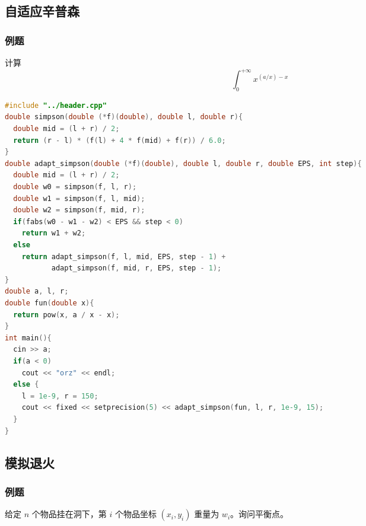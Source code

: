 \documentclass[10pt]{ctexart}
\begin{document}
\begin{multicols}{3}
    \subsection{自适应辛普森}\label{ux81eaux9002ux5e94ux8f9bux666eux68ee}

    \subsubsection{例题}\label{ux4f8bux9898-10}

    计算 \[\int_{0}^{+\infty} x^{(a/x) - x}\]

\begin{lstlisting}[language={C++}]
#include "../header.cpp"
double simpson(double (*f)(double), double l, double r){
  double mid = (l + r) / 2;
  return (r - l) * (f(l) + 4 * f(mid) + f(r)) / 6.0;
}
double adapt_simpson(double (*f)(double), double l, double r, double EPS, int step){
  double mid = (l + r) / 2;
  double w0 = simpson(f, l, r);
  double w1 = simpson(f, l, mid);
  double w2 = simpson(f, mid, r);
  if(fabs(w0 - w1 - w2) < EPS && step < 0)
    return w1 + w2;
  else
    return adapt_simpson(f, l, mid, EPS, step - 1) + 
           adapt_simpson(f, mid, r, EPS, step - 1);
}
double a, l, r;
double fun(double x){
  return pow(x, a / x - x);
}
int main(){
  cin >> a;
  if(a < 0)
    cout << "orz" << endl;
  else {
    l = 1e-9, r = 150;
    cout << fixed << setprecision(5) << adapt_simpson(fun, l, r, 1e-9, 15);
  }
}
\end{lstlisting}

    \subsection{模拟退火}\label{ux6a21ux62dfux9000ux706b}

    \subsubsection{例题}\label{ux4f8bux9898-11}

    给定 \(n\) 个物品挂在洞下，第 \(i\) 个物品坐标 \((x_i, y_i)\) 重量为
    \(w_i\)。询问平衡点。


\end{multicols}
\end{document}
